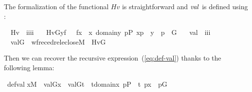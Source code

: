 The formalization of the functional $\mathit{Hv}$ is straightforward and $\operatorname{\mathit{val}}$ is defined using :
%
\begin{isabelle}
\isamarkupfalse%
\isanewline
\ \ Hv\ {\isacharcolon}{\isacharcolon}\ {\isachardoublequoteopen}i{\isasymRightarrow}i{\isasymRightarrow}i{\isasymRightarrow}i{\isachardoublequoteclose}\ \isanewline
\ \ {\isachardoublequoteopen}Hv{\isacharparenleft}G{\isacharcomma}y{\isacharcomma}f{\isacharparenright}\ {\isacharequal}{\isacharequal}\ {\isacharbraceleft}\ f{\isacharbackquote}x\ {\isachardot}{\isachardot}\ x{\isasymin}\ domain{\isacharparenleft}y{\isacharparenright}{\isacharcomma}\ {\isasymexists}p{\isasymin}P{\isachardot}\ {\isacharless}x{\isacharcomma}p{\isachargreater}\ {\isasymin}\ y\ {\isasymand}\ p\ {\isasymin}\ G\ {\isacharbraceright}{\isachardoublequoteclose}\isanewline
\isanewline
{}\isamarkupfalse%
\isanewline
\ \ val\ {\isacharcolon}{\isacharcolon}\ {\isachardoublequoteopen}i{\isasymRightarrow}i{\isasymRightarrow}i{\isachardoublequoteclose}\ \isanewline
\ \ {\isachardoublequoteopen}val{\isacharparenleft}G{\isacharcomma}{\isasymtau}{\isacharparenright}\ {\isacharequal}{\isacharequal}\ wfrec{\isacharparenleft}edrel{\isacharparenleft}eclose{\isacharparenleft}M{\isacharparenright}{\isacharparenright}{\isacharcomma}\ {\isasymtau}{\isacharcomma}\ Hv{\isacharparenleft}G{\isacharparenright}{\isacharparenright}{\isachardoublequoteclose}
\end{isabelle}
Then we can recover the recursive expression~(\ref{eq:def-val}) thanks to the
following lemma:
%
\begin{isabelle}
\isamarkupfalse%
\ def{\isacharunderscore}val{\isacharcolon}
\isanewline
   {\isachardoublequoteopen}x{\isasymin}M\ {\isasymLongrightarrow}\ val{\isacharparenleft}G{\isacharcomma}x{\isacharparenright}\ {\isacharequal}\ {\isacharbraceleft}val{\isacharparenleft}G{\isacharcomma}t{\isacharparenright}\ {\isachardot}{\isachardot}\ t{\isasymin}domain{\isacharparenleft}x{\isacharparenright}{\isacharcomma}\ {\isasymexists}p{\isasymin}P\ {\isachardot}\ {\isasymlangle}t{\isacharcomma}\ p{\isasymrangle}{\isasymin}x\ {\isasymand}\ p{\isasymin}G{\isacharbraceright}{\isachardoublequoteclose}
\end{isabelle}

